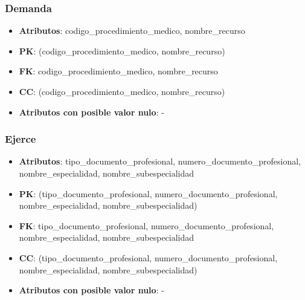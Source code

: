 \documentclass[a4paper,11pt]{article}
\begin{document}
\subsubsection{\textbf{Demanda}}

\begin{itemize}

\item 
\textbf{Atributos}: codigo\_procedimiento\_medico, nombre\_recurso

\item 
\textbf{PK}: (codigo\_procedimiento\_medico, nombre\_recurso)

\item
\textbf{FK}: codigo\_procedimiento\_medico, nombre\_recurso 

\item 
\textbf{CC}: (codigo\_procedimiento\_medico, nombre\_recurso)

\item 
\textbf{Atributos con posible valor nulo}: -

\end{itemize}


\subsubsection{\textbf{Ejerce}}

\begin{itemize}

\item 
\textbf{Atributos}: tipo\_documento\_profesional, numero\_documento\_profesional, nombre\_especialidad,
nombre\_subespecialidad

\item 
\textbf{PK}: (tipo\_documento\_profesional, numero\_documento\_profesional, nombre\_especialidad,
nombre\_subespecialidad)

\item
\textbf{FK}: tipo\_documento\_profesional, numero\_documento\_profesional, nombre\_especialidad,
nombre\_subespecialidad

\item 
\textbf{CC}: (tipo\_documento\_profesional, numero\_documento\_profesional, nombre\_especialidad,
nombre\_subespecialidad)

\item 
\textbf{Atributos con posible valor nulo}: -

\end{itemize}
\end{document}
